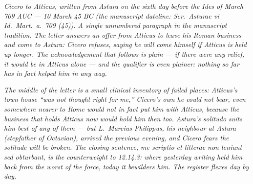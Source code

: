 
\textit{Cicero to Atticus, written from Astura on the
sixth day before the Ides of March 709 AUC --- 10
March 45 BC (the manuscript dateline: \textit{Scr.\
Asturae vi Id.\ Mart.\ a.\ 709 (45)}). A single
unnumbered paragraph in the manuscript tradition. The
letter answers an offer from Atticus to leave his
Roman business and come to Astura: Cicero refuses,
saying he will come himself if Atticus is held up
longer. The acknowledgement that follows is plain ---
if there were any relief, it would be in Atticus
alone --- and the qualifier is even plainer: nothing
so far has in fact helped him in any way.}

\textit{The middle of the letter is a small clinical
inventory of failed places: Atticus's town house ``was
not thought right for me,'' Cicero's own he could not
bear, even somewhere nearer to Rome would not in fact
put him with Atticus, because the business that holds
Atticus now would hold him then too. Astura's
\textit{solitudo} suits him best of any of them ---
but L.\ Marcius Philippus, his neighbour at Astura
(stepfather of Octavian), arrived the previous
evening, and Cicero fears the solitude will be broken.
The closing sentence, \textit{me scriptio et litterae
non leniunt sed obturbant}, is the counterweight to
12.14.3: where yesterday writing held him back from
the worst of the force, today it bewilders him. The
register flexes day by day.}

